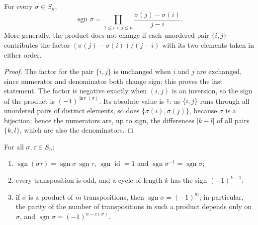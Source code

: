 \begin{lemma}
\label{lem:sign-product}
For every $\sigma\in S_n$,
\[
\operatorname{sgn}\sigma=\prod_{1\le i<j\le n}\frac{\sigma(j)-\sigma(i)}{j-i} .
\]
More generally, the product does not change if each unordered pair $\{i,j\}$ contributes the factor $(\sigma(j)-\sigma(i))/(j-i)$ with its two elements taken in either order.
\end{lemma}

\begin{proof}
The factor for the pair $\{i,j\}$ is unchanged when $i$ and $j$ are exchanged, since numerator and denominator both change sign; this proves the last statement. The factor is negative exactly when $(i,j)$ is an inversion, so the sign of the product is $(-1)^{\operatorname{inv}(\sigma)}$. Its absolute value is $1$: as $\{i,j\}$ runs through all unordered pairs of distinct elements, so does $\{\sigma(i),\sigma(j)\}$, because $\sigma$ is a bijection; hence the numerators are, up to sign, the differences $|k-l|$ of all pairs $\{k,l\}$, which are also the denominators.
\end{proof}

\begin{theorem}
\label{thm:sign-multiplicative}
For all $\sigma,\tau\in S_n$:
\begin{enumerate}
\item $\operatorname{sgn}(\sigma\tau)=\operatorname{sgn}\sigma\,\operatorname{sgn}\tau$, $\operatorname{sgn}\operatorname{id}=1$ and $\operatorname{sgn}\sigma^{-1}=\operatorname{sgn}\sigma$;
\item every transposition is odd, and a cycle of length $k$ has the sign $(-1)^{k-1}$;
\item if $\sigma$ is a product of $m$ transpositions, then $\operatorname{sgn}\sigma=(-1)^m$; in particular, the parity of the number of transpositions in such a product depends only on $\sigma$, and $\operatorname{sgn}\sigma=(-1)^{n-c(\sigma)}$.
\end{enumerate}
\end{theorem}

